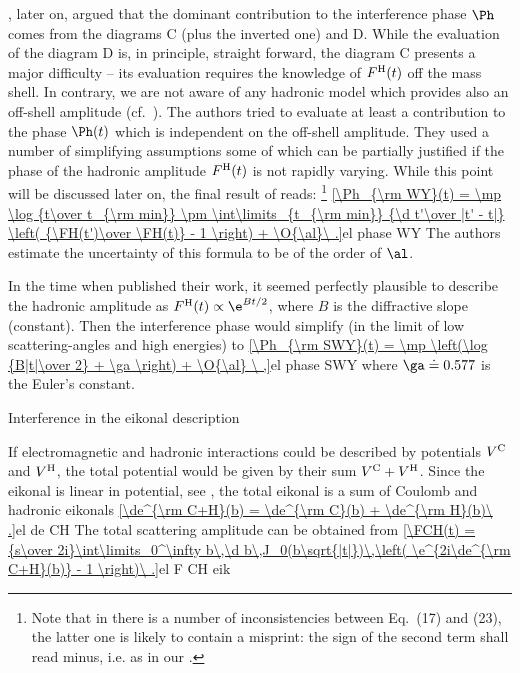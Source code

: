 \WY, later on, argued that the dominant contribution to the interference phase $\Ph$ comes from the diagrams  C (plus the inverted one) and D. While the evaluation of the diagram D is, in principle, straight forward, the diagram C presents a major difficulty -- its evaluation requires the knowledge of $F^{\rm H}(t)$ off the mass shell. In contrary, we are not aware of any hadronic model which provides also an off-shell amplitude (cf.~). The authors tried to evaluate at least a contribution to the phase $\Ph(t)$ which is independent on the off-shell amplitude. They used a number of simplifying assumptions some of which can be partially justified if the phase of the hadronic amplitude $F^{\rm H}(t)$ is not rapidly varying. While this point will be discussed later on, the final result of \WY{} reads: \footnote{%
Note that in  there is a number of inconsistencies between Eq.~(17) and (23), the latter one is likely to contain a misprint: the sign of the second term shall read minus, i.e. as in our .
}
\eqref{\Ph_{\rm WY}(t) = \mp \log {t\over t_{\rm min}} \pm \int\limits_{t_{\rm min}} {\d t'\over |t' - t|} \left( {\FH(t')\over \FH(t)} - 1 \right) + \O{\al}\ .}{el phase WY}
The authors estimate the uncertainty of this formula to be of the order of $\al$.

In the time when \WY{} published their work, it seemed perfectly plausible to describe the hadronic amplitude as $\FH(t) \propto \e^{Bt/2}$, where $B$ is the diffractive slope (constant). Then the interference phase would simplify (in the limit of low scattering-angles and high energies) to
\eqref{\Ph_{\rm SWY}(t) = \mp \left(\log {B|t|\over 2} + \ga \right) + \O{\al} \ ,}{el phase SWY}
where $\ga \doteq 0.577$ is the Euler's constant.



\caption{Interference in the eikonal description}

If electromagnetic and hadronic interactions could be described by potentials $V^{\rm C}$ and $V^{\rm H}$, the total potential would be given by their sum $V^{\rm C} + V^{\rm H}$. Since the eikonal is linear in potential, see , the total eikonal is a sum of Coulomb and hadronic eikonals
\eqref{\de^{\rm C+H}(b) = \de^{\rm C}(b) + \de^{\rm H}(b)\ .}{el de CH}
The total scattering amplitude can be obtained from 
\eqref{\FCH(t) = {s\over 2i}\int\limits_0^\infty b\,\d b\,J_0(b\sqrt{|t|})\,\left( \e^{2i\de^{\rm C+H}(b)} - 1 \right)\ .}{el F CH eik}


